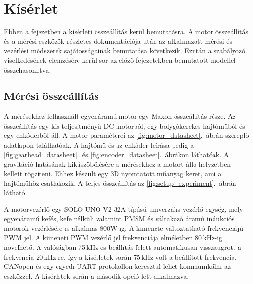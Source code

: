 \chapter{Kísérlet}\label{chap:experiment}

Ebben a fejezetben a kísérleti összeállítás kerül bemutatásra. A motor összeállítás és a mérési eszközök 
részletes dokumentációja után az alkalmazott mérési és vezérlési módszerek sajátosságainak bemutatása 
következik. Ezután a szabályozó viselkedésének elemzésére kerül sor az előző fejezetekben bemutatott modellel 
összehasonlítva.

\section{Mérési összeállítás}
A mérésekhez felhasznált egyenáramú motor egy Maxon összeállítás része. Az összeállítás egy 
kis teljesítményű DC motorból, egy bolygókerekes hajtóműből és egy enkóderből áll. A motor paraméterei
az \ref{fig:motor_datasheet}.~ábrán szereplő adatlapon találhatóak. A hajtómű és az enkóder leírása pedig 
a \ref{fig:gearhead_datasheet}.~és \ref{fig:encoder_datasheet}.~ábrákon láthatóak. 
A gravitáció hatásának 
kiküszöbölésére a mérésekhez a motort álló helyzetben kellett rögzíteni. Ehhez készült egy 3D nyomtatott 
műanyag keret, ami a hajtóműhöz csatlakozik. A teljes összeállítás az \ref{fig:setup_experiment}.~ábrán 
látható. 

A motorvezérlő egy SOLO UNO V2 32A típúsú univerzális vezérlő egység, mely egyenáramú kefés, kefe 
nélküli valamint PMSM és váltakozó áramú indukciós motorok vezérlésére is alkalmas 800W-ig. 
A kimenete változtatható frekvenciájú PWM jel. A kimeneti PWM vezérlő jel frekvenciája elméletben 80\,kHz-ig 
növelhető. A valóságban 75\,kHz-es beállítás felett automatikusan visszaugrott a frekvencia 20\,kHz-re, így 
a kísérletek során 75\,kHz volt a beállított frekvencia. CANopen és egy egyedi UART 
protokollon keresztül lehet kommunikálni az eszközzel. A kísérletek során a második opció lett alkalmazva.





